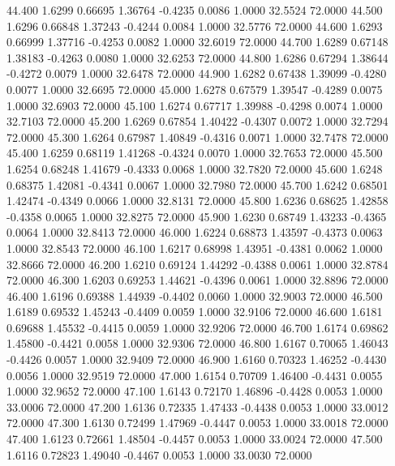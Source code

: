   44.400   1.6299   0.66695   1.36764  -0.4235   0.0086   1.0000  32.5524  72.0000
  44.500   1.6296   0.66848   1.37243  -0.4244   0.0084   1.0000  32.5776  72.0000
  44.600   1.6293   0.66999   1.37716  -0.4253   0.0082   1.0000  32.6019  72.0000
  44.700   1.6289   0.67148   1.38183  -0.4263   0.0080   1.0000  32.6253  72.0000
  44.800   1.6286   0.67294   1.38644  -0.4272   0.0079   1.0000  32.6478  72.0000
  44.900   1.6282   0.67438   1.39099  -0.4280   0.0077   1.0000  32.6695  72.0000
  45.000   1.6278   0.67579   1.39547  -0.4289   0.0075   1.0000  32.6903  72.0000
  45.100   1.6274   0.67717   1.39988  -0.4298   0.0074   1.0000  32.7103  72.0000
  45.200   1.6269   0.67854   1.40422  -0.4307   0.0072   1.0000  32.7294  72.0000
  45.300   1.6264   0.67987   1.40849  -0.4316   0.0071   1.0000  32.7478  72.0000
  45.400   1.6259   0.68119   1.41268  -0.4324   0.0070   1.0000  32.7653  72.0000
  45.500   1.6254   0.68248   1.41679  -0.4333   0.0068   1.0000  32.7820  72.0000
  45.600   1.6248   0.68375   1.42081  -0.4341   0.0067   1.0000  32.7980  72.0000
  45.700   1.6242   0.68501   1.42474  -0.4349   0.0066   1.0000  32.8131  72.0000
  45.800   1.6236   0.68625   1.42858  -0.4358   0.0065   1.0000  32.8275  72.0000
  45.900   1.6230   0.68749   1.43233  -0.4365   0.0064   1.0000  32.8413  72.0000
  46.000   1.6224   0.68873   1.43597  -0.4373   0.0063   1.0000  32.8543  72.0000
  46.100   1.6217   0.68998   1.43951  -0.4381   0.0062   1.0000  32.8666  72.0000
  46.200   1.6210   0.69124   1.44292  -0.4388   0.0061   1.0000  32.8784  72.0000
  46.300   1.6203   0.69253   1.44621  -0.4396   0.0061   1.0000  32.8896  72.0000
  46.400   1.6196   0.69388   1.44939  -0.4402   0.0060   1.0000  32.9003  72.0000
  46.500   1.6189   0.69532   1.45243  -0.4409   0.0059   1.0000  32.9106  72.0000
  46.600   1.6181   0.69688   1.45532  -0.4415   0.0059   1.0000  32.9206  72.0000
  46.700   1.6174   0.69862   1.45800  -0.4421   0.0058   1.0000  32.9306  72.0000
  46.800   1.6167   0.70065   1.46043  -0.4426   0.0057   1.0000  32.9409  72.0000
  46.900   1.6160   0.70323   1.46252  -0.4430   0.0056   1.0000  32.9519  72.0000
  47.000   1.6154   0.70709   1.46400  -0.4431   0.0055   1.0000  32.9652  72.0000
  47.100   1.6143   0.72170   1.46896  -0.4428   0.0053   1.0000  33.0006  72.0000
  47.200   1.6136   0.72335   1.47433  -0.4438   0.0053   1.0000  33.0012  72.0000
  47.300   1.6130   0.72499   1.47969  -0.4447   0.0053   1.0000  33.0018  72.0000
  47.400   1.6123   0.72661   1.48504  -0.4457   0.0053   1.0000  33.0024  72.0000
  47.500   1.6116   0.72823   1.49040  -0.4467   0.0053   1.0000  33.0030  72.0000
